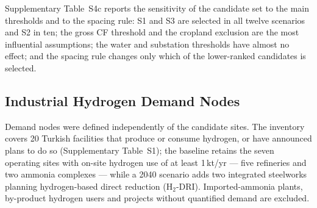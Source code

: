 \documentclass[preprint,12pt,authoryear]{elsarticle}
\begin{document}
\begin{table}[htbp]
\centering
\caption{Stage~I candidate sites. Cluster values refer to the whole DBSCAN cluster; site values refer to its representative cell (largest eligible area).}
\label{tab:candidate_sites}
\end{table}

Supplementary Table~S4c reports the sensitivity of the candidate set to the main thresholds and to the spacing rule: S1 and S3 are selected in all twelve scenarios and S2 in ten; the gross CF threshold and the cropland exclusion are the most influential assumptions; the water and substation thresholds have almost no effect; and the spacing rule changes only which of the lower-ranked candidates is selected.

\subsection{Industrial Hydrogen Demand Nodes}
\label{sec:demand}
Demand nodes were defined independently of the candidate sites. The inventory covers 20 Turkish facilities that produce or consume hydrogen, or have announced plans to do so (Supplementary Table~S1); the baseline retains the seven operating sites with on-site hydrogen use of at least 1\,kt/yr --- five refineries and two ammonia complexes --- while a 2040 scenario adds two integrated steelworks planning hydrogen-based direct reduction (H$_2$-DRI). Imported-ammonia plants, by-product hydrogen users and projects without quantified demand are excluded.
\end{document}
